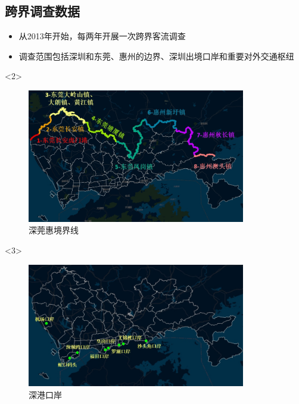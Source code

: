 \documentclass{beamerthemeMono}
\begin{document}
\subsection{跨界调查数据}

\begin{frame}[t]{\subsecname}
\begin{itemize}
\item 从2013年开始，每两年开展一次跨界客流调查
\item 调查范围包括深圳和东莞、惠州的边界、深圳出境口岸和重要对外交通枢纽
\end{itemize}

\begin{overlayarea}{\textwidth}{\textheight}
  \begin{onlyenv}<2>
\begin{figure}
  \centering
  \includegraphics[width=0.85\textwidth]{chp02_境界线.jpg}
  \caption{深莞惠境界线}
\end{figure}
  \end{onlyenv}

  \begin{onlyenv}<3>
\begin{figure}
  \centering
  \includegraphics[width=0.85\textwidth]{chp02_口岸.jpg}
  \caption{深港口岸}
\end{figure}
  \end{onlyenv}


\end{overlayarea}
\end{frame}
\end{document}
